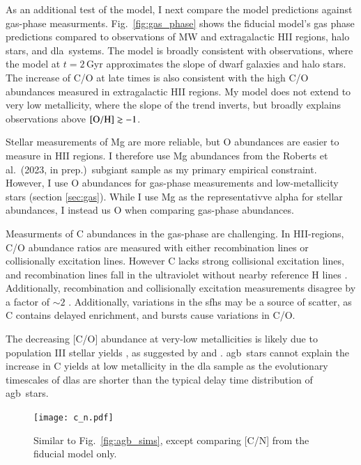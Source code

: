 \documentclass[12pt,oneside,letterpaper]{report}
\newcommand{\agb}{\gls{agb}}
\newcommand{\sfh}{\gls{sfh}}
\newcommand{\dla}{\gls{dla}}
\newcommand{\citetjack}{Roberts et al.~(2023, in prep.)}
\newcommand{\about}[1]{${\sim} #1$}
\begin{document}
As an additional test of the model, I next compare the model predictions against gas-phase measurments. Fig.~\ref{fig:gas_phase} shows the fiducial model's gas phase predictions compared to observations of MW and extragalactic HII regions, halo stars, and \dla\ systems. The model is broadly consistent with observations, where the model at $t=2$\,Gyr approximates the slope of dwarf galaxies and halo stars. The increase of C/O at late times is also consistent with the high C/O abundances measured in extragalactic HII regions. 
My model does not extend to very low metallicity, where the slope of the trend inverts, but broadly explains observations above $\rm [O/H] \gtrsim -1$. 

Stellar measurements of Mg are more reliable, but O abundances are easier to measure in HII regions.  I therefore use Mg abundances from the \citetjack~\gls{subgiant} sample as my primary empirical constraint. However, I use O abundances for gas-phase measurements and low-metallicity stars (section  \ref{sec:gas}). 
While I use Mg as the representativve \gls{alpha} for stellar abundances, I instead us O when comparing gas-phase abundances.

Measurments of C abundances in the gas-phase are challenging. In HII-regions, C/O abundance ratios are measured with either recombination lines or collisionally excitation lines. However C lacks strong collisional excitation lines, and recombination lines fall in the ultraviolet without nearby reference H lines \citep{skillman+20}. Additionally, recombination and collisionally excitation measurements disagree by a factor of \about{2} \citep{GR07}.
Additionally, variations in the \sfh{}s may be a source of scatter, as C contains delayed enrichment, and bursts cause variations in C/O. 

The decreasing [C/O] abundance at very-low metallicities is likely due to population III stellar yields \citep[e.g.][]{hirschi07}, as suggested by \citet{cooke+17} and \citet{FN15}. \agb\ stars cannot explain the increase in C yields at low metallicity in the \dla{} sample as the evolutionary timescales of \dla{}s are shorter than the typical delay time distribution of \agb\ stars.

\begin{figure}[htp]
    \centering
    \texttt{[image: c\_n.pdf]}
    \caption[C/N abundance agreement]{Similar to Fig.~\ref{fig:agb_sims}, except comparing [C/N] from the fiducial model only.
    }
\end{figure}
\end{document}
